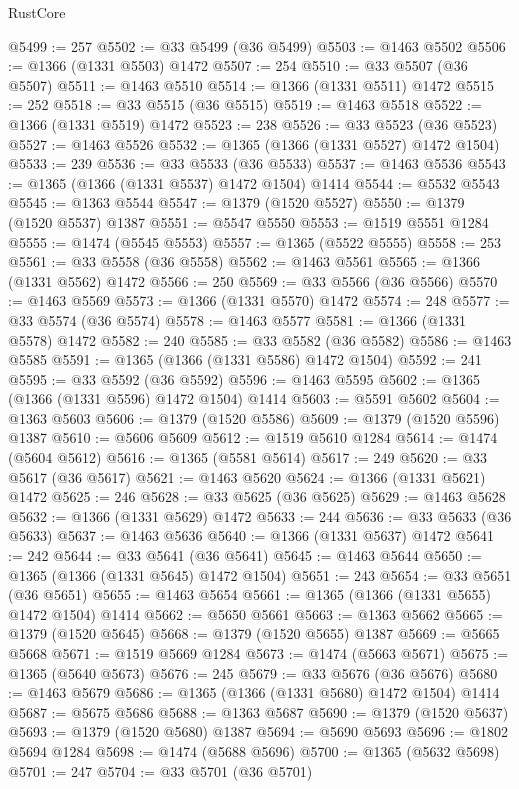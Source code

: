 \begin{lexlean}{RustCore}
\begin{coremodule}
@5499 := 257
@5502 := @33 @5499 (@36 @5499)
@5503 := @1463 @5502
@5506 := @1366 (@1331 @5503) @1472
@5507 := 254
@5510 := @33 @5507 (@36 @5507)
@5511 := @1463 @5510
@5514 := @1366 (@1331 @5511) @1472
@5515 := 252
@5518 := @33 @5515 (@36 @5515)
@5519 := @1463 @5518
@5522 := @1366 (@1331 @5519) @1472
@5523 := 238
@5526 := @33 @5523 (@36 @5523)
@5527 := @1463 @5526
@5532 := @1365 (@1366 (@1331 @5527) @1472 @1504)
@5533 := 239
@5536 := @33 @5533 (@36 @5533)
@5537 := @1463 @5536
@5543 := @1365 (@1366 (@1331 @5537) @1472 @1504) @1414
@5544 := @5532 @5543
@5545 := @1363 @5544
@5547 := @1379 (@1520 @5527)
@5550 := @1379 (@1520 @5537) @1387
@5551 := @5547 @5550
@5553 := @1519 @5551 @1284
@5555 := @1474 (@5545 @5553)
@5557 := @1365 (@5522 @5555)
@5558 := 253
@5561 := @33 @5558 (@36 @5558)
@5562 := @1463 @5561
@5565 := @1366 (@1331 @5562) @1472
@5566 := 250
@5569 := @33 @5566 (@36 @5566)
@5570 := @1463 @5569
@5573 := @1366 (@1331 @5570) @1472
@5574 := 248
@5577 := @33 @5574 (@36 @5574)
@5578 := @1463 @5577
@5581 := @1366 (@1331 @5578) @1472
@5582 := 240
@5585 := @33 @5582 (@36 @5582)
@5586 := @1463 @5585
@5591 := @1365 (@1366 (@1331 @5586) @1472 @1504)
@5592 := 241
@5595 := @33 @5592 (@36 @5592)
@5596 := @1463 @5595
@5602 := @1365 (@1366 (@1331 @5596) @1472 @1504) @1414
@5603 := @5591 @5602
@5604 := @1363 @5603
@5606 := @1379 (@1520 @5586)
@5609 := @1379 (@1520 @5596) @1387
@5610 := @5606 @5609
@5612 := @1519 @5610 @1284
@5614 := @1474 (@5604 @5612)
@5616 := @1365 (@5581 @5614)
@5617 := 249
@5620 := @33 @5617 (@36 @5617)
@5621 := @1463 @5620
@5624 := @1366 (@1331 @5621) @1472
@5625 := 246
@5628 := @33 @5625 (@36 @5625)
@5629 := @1463 @5628
@5632 := @1366 (@1331 @5629) @1472
@5633 := 244
@5636 := @33 @5633 (@36 @5633)
@5637 := @1463 @5636
@5640 := @1366 (@1331 @5637) @1472
@5641 := 242
@5644 := @33 @5641 (@36 @5641)
@5645 := @1463 @5644
@5650 := @1365 (@1366 (@1331 @5645) @1472 @1504)
@5651 := 243
@5654 := @33 @5651 (@36 @5651)
@5655 := @1463 @5654
@5661 := @1365 (@1366 (@1331 @5655) @1472 @1504) @1414
@5662 := @5650 @5661
@5663 := @1363 @5662
@5665 := @1379 (@1520 @5645)
@5668 := @1379 (@1520 @5655) @1387
@5669 := @5665 @5668
@5671 := @1519 @5669 @1284
@5673 := @1474 (@5663 @5671)
@5675 := @1365 (@5640 @5673)
@5676 := 245
@5679 := @33 @5676 (@36 @5676)
@5680 := @1463 @5679
@5686 := @1365 (@1366 (@1331 @5680) @1472 @1504) @1414
@5687 := @5675 @5686
@5688 := @1363 @5687
@5690 := @1379 (@1520 @5637)
@5693 := @1379 (@1520 @5680) @1387
@5694 := @5690 @5693
@5696 := @1802 @5694 @1284
@5698 := @1474 (@5688 @5696)
@5700 := @1365 (@5632 @5698)
@5701 := 247
@5704 := @33 @5701 (@36 @5701)

\end{coremodule}
\end{lexlean}
